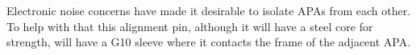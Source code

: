 Electronic noise concerns have made it desirable to isolate APAs from each other.  To help with that this alignment pin, although it will have a steel core for strength, will have a G10 sleeve where it contacts the frame of the adjacent APA.




%
%
%
%
%
%
%
%
